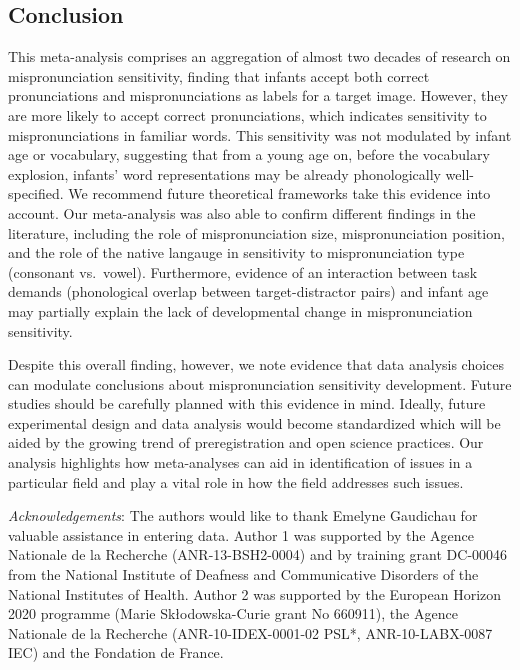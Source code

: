 \documentclass[man]{apa6}
\begin{document}
\hypertarget{conclusion}{%
\subsection{Conclusion}\label{conclusion}}

This meta-analysis comprises an aggregation of almost two decades of research on mispronunciation sensitivity, finding that infants accept both correct pronunciations and mispronunciations as labels for a target image. However, they are more likely to accept correct pronunciations, which indicates sensitivity to mispronunciations in familiar words. This sensitivity was not modulated by infant age or vocabulary, suggesting that from a young age on, before the vocabulary explosion, infants' word representations may be already phonologically well-specified. We recommend future theoretical frameworks take this evidence into account. Our meta-analysis was also able to confirm different findings in the literature, including the role of mispronunciation size, mispronunciation position, and the role of the native langauge in sensitivity to mispronunciation type (consonant vs.~vowel). Furthermore, evidence of an interaction between task demands (phonological overlap between target-distractor pairs) and infant age may partially explain the lack of developmental change in mispronunciation sensitivity.

Despite this overall finding, however, we note evidence that data analysis choices can modulate conclusions about mispronunciation sensitivity development. Future studies should be carefully planned with this evidence in mind. Ideally, future experimental design and data analysis would become standardized which will be aided by the growing trend of preregistration and open science practices. Our analysis highlights how meta-analyses can aid in identification of issues in a particular field and play a vital role in how the field addresses such issues.

\newpage

\emph{Acknowledgements}: The authors would like to thank Emelyne Gaudichau for valuable assistance in entering data. Author 1 was supported by the Agence Nationale de la Recherche (ANR-13-BSH2-0004) and by training grant DC-00046 from the National Institute of Deafness and Communicative Disorders of the National Institutes of Health. Author 2 was supported by the European Horizon 2020 programme (Marie Skłodowska-Curie grant No 660911), the Agence Nationale de la Recherche (ANR-10-IDEX-0001-02 PSL*, ANR-10-LABX-0087 IEC) and the Fondation de France.
\end{document}
